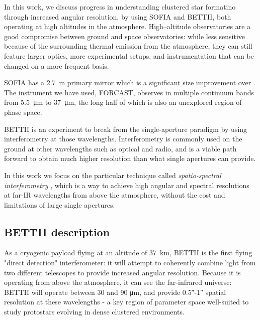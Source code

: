 In this work, we discuss progress in understanding clustered star formatino through increased angular resolution, by using SOFIA and BETTII, both operating at high altitudes in the atmosphere. High--altitude observatories are a good compromise between ground and space observatories: while less sensitive because of the surrounding thermal emission from the atmosphere, they can still feature larger optics, more experimental setups, and instrumentation that can be changed on a more frequent basis.

SOFIA has a \SI{2.7}{\meter} primary mirror which is a significant size improvement over \Spitzer. The instrument we have used, FORCAST, observes in multiple continuum bands from \SI{5.5}{\micro\meter} to \SI{37}{\micro\meter}, the long half of which is also an unexplored region of phase space.

BETTII is an experiment to break from the single-aperture paradigm by using interferometry at those wavelengths. Interferometry is commonly used on the ground at other wavelengths such as optical and radio, and is a viable path forward to obtain much
higher resolution than what single apertures can provide. 

In this work we focus on the particular technique called \textit{spatio-spectral interferometry} \citep{Mariotti:1988vea}, which is a way to achieve 
high angular and spectral resolutions at far-IR wavelengths from above the atmosphere, without the cost and limitations of large single apertures. 


\subsection{BETTII description}

As a cryogenic payload flying at an altitude of \SI{37}{\kilo\meter}, BETTII is the first flying "direct detection" interferometer: it will attempt to coherently combine light from two different telescopes to provide increased angular resolution. Because it is operating from above the atmosphere, it can see the far-infrared universe: BETTII will operate between 30 and 90 \si{\micro\meter}, and provide \ang{;;0.5}-\ang{;;1} spatial resolution at these wavelengths - a key region of parameter space well-suited to study protostars evolving in dense clustered environments.

